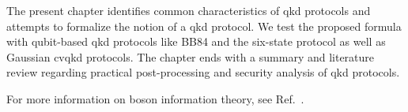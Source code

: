 The present chapter identifies common characteristics of \gls{qkd} protocols and attempts to formalize the notion of a \gls{qkd} protocol.
We test the proposed formula with qubit-based \gls{qkd} protocols like BB84 and the six-state protocol as well as Gaussian \gls{cvqkd} protocols.
The chapter ends with a summary and literature review regarding practical post-processing and security analysis of \gls{qkd} protocols.

For more information on boson information theory, see Ref.~\cite{Weedbrook2012,Ferraro2005}.


